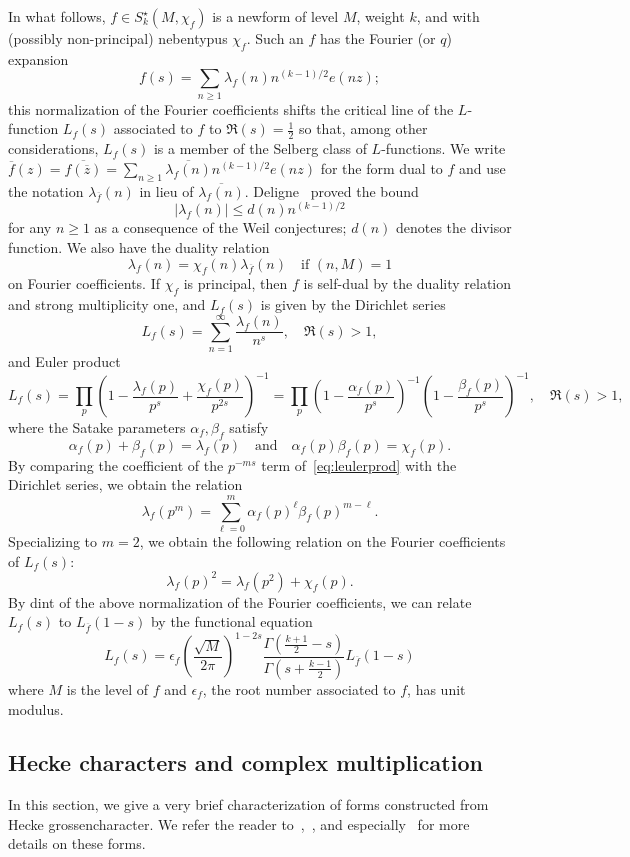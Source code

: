 \documentclass[11pt,reqno]{amsart} \usepackage{fullpage}
\renewcommand{\leq}{\leqslant}
\renewcommand{\geq}{\geqslant}
\newcommand\be{\begin{equation}}
\newcommand\ee{\end{equation}}
\numberwithin{equation}{section}
\begin{document}
In what follows, $f\in S_k^\star(M,\chi_f)$ is a newform of level $M$, weight $k$, and with
(possibly non-principal) nebentypus $\chi_f$. Such an $f$ has the Fourier (or $q$)
expansion \be f(s) = \sum_{n\geq1}\lambda_f(n)n^{(k-1)/2}e(nz); \ee
this normalization of the Fourier coefficients shifts the critical line of the
$L$-function $L_f(s)$ associated to $f$ to $\Re(s)=\frac12$ so that, among other
considerations, $L_f(s)$ is a member of the Selberg class of $L$-functions.
We write $\overline f(z)=\overline{f(\overline z)}
=\sum_{n\geq1}\overline{\lambda_f(n)}n^{(k-1)/2}e(nz)$ for the form dual to
$f$ and use the notation $\lambda_{\overline f}(n)$ in lieu of
$\overline{\lambda_f(n)}$. Deligne~\cite{deligne} proved the bound
\be\left|\lambda_f(n)\right|\leq d(n)n^{(k-1)/2}\ee
for any $n\geq1$ as a consequence of the Weil conjectures; $d(n)$ denotes the
divisor function. We also have the duality relation
\be\label{eq:lambdaduality} \lambda_f(n)=\chi_f(n)\lambda_{\overline f}(n)
\quad\text{if $(n,M)=1$} \ee on Fourier coefficients. If $\chi_f$ is principal, then
$f$ is self-dual by the duality relation and strong multiplicity one, and
$L_f(s)$ is given by the Dirichlet series
\be L_f(s)=\sum_{n=1}^\infty \frac{\lambda_f(n)}{n^s},\quad\Re(s)>1, \ee
and Euler product
\be\label{eq:leulerprod} L_f(s) = \prod_p\left(1-\frac{\lambda_f(p)}{p^s}+\frac{\chi_f(p)}{p^{2s}}\right)^{-1}
=\prod_p\left(1-\frac{\alpha_f(p)}{p^s}\right)^{-1}
\left(1-\frac{\beta_f(p)}{p^s}\right)^{-1},\quad\Re(s)>1, \ee
where the Satake parameters $\alpha_f, \beta_f$ satisfy
\be \label{eq:satakeidentity}
\alpha_f(p)+\beta_f(p)=\lambda_f(p)\quad\text{and}\quad
\alpha_f(p)\beta_f(p)=\chi_f(p).
\ee
By comparing the coefficient of the $p^{-ms}$ term
of~\eqref{eq:leulerprod} with the Dirichlet series, we obtain the relation
\be\label{eq:fourierrelation} \lambda_f\left(p^m\right)
=\sum_{\ell=0}^m \alpha_f(p)^\ell \beta_f(p)^{m-\ell}. \ee
Specializing to $m=2$, we obtain the following relation on the Fourier
coefficients of $L_f(s)$:
\be\label{eq:fouriersquare}
\lambda_f(p)^2 = \lambda_f\left(p^2\right) + \chi_f(p). \ee
By dint of the above normalization of the Fourier coefficients, we can relate
$L_f(s)$ to $L_{\overline f}(1-s)$ by the functional equation
\be L_f(s)=\epsilon_f
\left(\frac{\sqrt M}{2\pi}\right)^{1-2s}
\frac{\Gamma\left(\frac{k+1}2-s\right)}{\Gamma\left(s+\frac{k-1}2\right)}
L_{\overline f}(1-s) \ee
where $M$ is the level of $f$ and $\epsilon_f$, the root number associated to
$f$, has unit modulus.

\subsection{Hecke characters and complex multiplication}\label{sec:cmforms}
In this section, we give a very brief characterization of forms constructed from Hecke
grossencharacter. We refer the reader to~\cite[\S12]{iwan},~\cite[\S4.8]{miyake}, and
especially~\cite{ribet} for more details on these forms.
\end{document}
